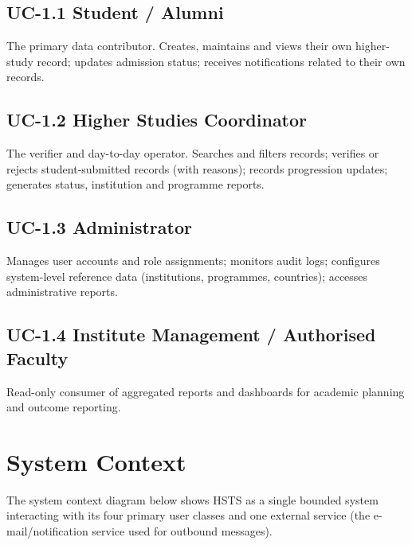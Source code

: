 \documentclass[11pt,a4paper]{article}
\begin{document}
\subsection*{UC-1.1 Student / Alumni}
The primary data contributor. Creates, maintains and views their own
higher-study record; updates admission status; receives notifications
related to their own records.

\subsection*{UC-1.2 Higher Studies Coordinator}
The verifier and day-to-day operator. Searches and filters records;
verifies or rejects student-submitted records (with reasons); records
progression updates; generates status, institution and programme reports.

\subsection*{UC-1.3 Administrator}
Manages user accounts and role assignments; monitors audit logs;
configures system-level reference data (institutions, programmes,
countries); accesses administrative reports.

\subsection*{UC-1.4 Institute Management / Authorised Faculty}
Read-only consumer of aggregated reports and dashboards for academic
planning and outcome reporting.

\section{System Context}
The system context diagram below shows HSTS as a single bounded system
interacting with its four primary user classes and one external service
(the e-mail/notification service used for outbound messages).
\end{document}
